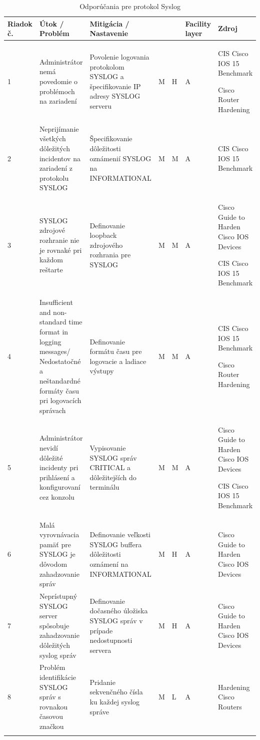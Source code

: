 \begin{longtable}[!htbp]{|C{2.5em}L{9em}L{9em}C{2em}C{2.5em}C{7.5em}L{10em}|}
	
	\hline
	\centering
	
	Riadok č.	&Útok / Problém	&Mitigácia / Nastavenie	& 	&	&Facility layer	&Zdroj\\
	\endhead
	
	 1	&Administrátor nemá povedomie o problémoch na zariadení	&Povolenie logovania protokolom SYSLOG a špecifikovanie IP adresy SYSLOG serveru	&M	&H	&A	&CIS Cisco IOS 15 Benchmark \cite{CIS_DrTLsgXv24lxeIIM}
	
	Cisco Router Hardening \cite{Graesser2001}\\
	2	&Neprijímanie všetkých dôležitých incidentov na zariadení z protokolu SYSLOG	&Špecifikovanie dôležitosti oznámenií SYSLOG na INFORMATIONAL	&M	&M	&A	&CIS Cisco IOS 15 Benchmark \cite{CIS_DrTLsgXv24lxeIIM}\\
	 3	&SYSLOG zdrojové rozhranie nie je rovnaké pri každom reštarte	& Definovanie loopback zdrojového rozhrania pre SYSLOG	&M	&M	&A	&Cisco Guide to Harden Cisco IOS Devices \cite{Singh2018}
	
	CIS Cisco IOS 15 Benchmark \cite{CIS_DrTLsgXv24lxeIIM}\\
	4	&Insufficient and non-standard  time format in logging messages/ Nedostatočné a neštandardné formáty času pri logovacích správach	&Definovanie formátu času pre logovacie a ladiace výstupy	&M	&M	&A	&CIS Cisco IOS 15 Benchmark \cite{CIS_DrTLsgXv24lxeIIM}
	
	Cisco Router Hardening \cite{Graesser2001}\\
	 5	&Administrátor nevidí dôležité incidenty pri prihlásení a konfigurovaní cez konzolu	&Vypisovanie SYSLOG správ CRITICAL a dôležitejších do terminálu	&M	&M	&A	&Cisco Guide to Harden Cisco IOS Devices \cite{Singh2018}
	
	CIS Cisco IOS 15 Benchmark \cite{CIS_DrTLsgXv24lxeIIM}\\
	6	&Malá vyrovnávacia pamäť pre SYSLOG je dôvodom zahadzovanie správ	&Definovanie veľkosti SYSLOG buffera dôležitosti oznámení na INFORMATIONAL	&M	&H	&A	&Cisco Guide to Harden Cisco IOS Devices \cite{Singh2018}\\
	 7	&Neprístupný SYSLOG server spôsobuje zahadzovanie dôležitých syslog správ	&Definovanie dočasného úložiska SYSLOG správ v prípade nedostupnosti servera	&M	&H	&A	&Cisco Guide to Harden Cisco IOS Devices \cite{Singh2018}\\
	8	&Problém identifikácie SYSLOG správ s rovnakou časovou značkou	&Pridanie sekvenčného čísla ku každej syslog správe	&M	&L	&A	&Hardening Cisco Routers \cite{Akin2002}\\
	
	\hline
	\caption{Odporúčania pre protokol Syslog}
	\label{tab:syslog}%
\end{longtable}%

